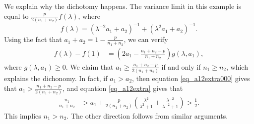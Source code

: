 We explain why the dichotomy happens. The variance limit in this example is equal to
$\frac{p}{2(n_1 + n_2)} f(\lambda)$, where
\[ f(\lambda) = {(\lambda^{-2} a_1 + a_2)^{-1} + (\lambda^2 a_1 + a_2)^{-1}}. \]
Using the fact that $a_1 + a_2 = 1 - \frac{p}{n_1 + n_2}$, we can verify
\begin{align*}
	f(\lambda) - f(1) &= \left(2a_1 - \frac{n_1 + n_2-p} {n_1 + n_2 }\right)  g(\lambda, a_1), %
\end{align*}
where $g(\lambda, a_1) \ge 0$.
We claim that $a_1 \ge \frac{n_1 + n_2-p}{2(n_1 + n_2 )}$ if and only if $n_1 \ge n_2$, which explains the dichonomy. In fact, if $a_1>a_2$, then equation \eqref{eq_a12extra000} gives that $a_1> \frac{n_1 + n_2-p}{2 (n_1 + n_2)}$, and equation \eqref{eq_a12extra} gives that
\begin{align*}
 \frac{n_1}{n_1 + n_2} &> a_1 + \frac{p}{2(n_1+n_2)} \left(\frac{\lambda^2}{\lambda^2+1}+\frac{\lambda^{-2}}{\lambda^{-2}+1}\right) >\frac{1}{2}.
\end{align*}
This implies $n_1>n_2$. The other direction follows from similar arguments. %

 
